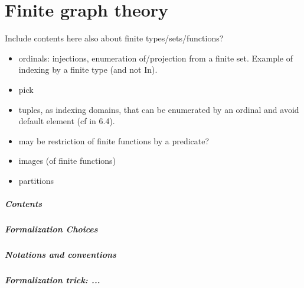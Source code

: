 \chapter{Finite graph theory}


Include contents here also about finite types/sets/functions?

\begin{itemize}
\item ordinals: injections, enumeration of/projection from a finite
  set. Example of indexing by a finite type (and not In).
\item pick
\item tuples, as indexing domains, that can be enumerated by an
  ordinal and avoid default element (cf  in
  6.4).
\item may be restriction of finite functions by a predicate?
\item images (of finite functions)
\item partitions
\end{itemize}
\paragraph{Contents}

\paragraph{Formalization Choices}

\paragraph{Notations and conventions}

\paragraph{Formalization trick: ...}
